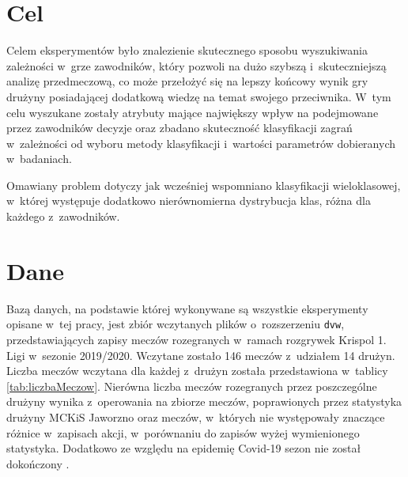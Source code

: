 \documentclass[a4paper,twoside,12pt]{book}
\begin{document}
\section{Cel}
Celem eksperymentów było znalezienie skutecznego sposobu wyszukiwania zależności w~grze zawodników, który pozwoli na dużo szybszą i~skuteczniejszą analizę przedmeczową, co może przełożyć się na lepszy końcowy wynik gry drużyny posiadającej dodatkową wiedzę na temat swojego przeciwnika. W~tym celu wyszukane zostały atrybuty mające największy wpływ na podejmowane przez zawodników decyzje oraz zbadano skuteczność klasyfikacji zagrań w~zależności od wyboru metody klasyfikacji i~wartości parametrów dobieranych w~badaniach. 

Omawiany problem dotyczy jak wcześniej wspomniano klasyfikacji wieloklasowej, w~której występuje dodatkowo nierównomierna dystrybucja klas, różna dla każdego z~zawodników.


\section{Dane}
\label{roz:dane}

Bazą danych, na podstawie której wykonywane są wszystkie eksperymenty opisane w~tej pracy, jest zbiór wczytanych plików o~rozszerzeniu \texttt{dvw}, przedstawiających zapisy meczów rozegranych w~ramach rozgrywek Krispol 1. Ligi w~sezonie 2019/2020. Wczytane zostało 146 meczów z~udziałem 14 drużyn. Liczba meczów wczytana dla każdej z~drużyn została przedstawiona w~tablicy \ref{tab:liczbaMeczow}. Nierówna liczba meczów rozegranych przez poszczególne drużyny wynika z~operowania na zbiorze meczów, poprawionych przez statystyka drużyny MCKiS Jaworzno oraz meczów, w~których nie występowały znaczące różnice w~zapisach akcji, w~porównaniu do zapisów wyżej wymienionego statystyka. Dodatkowo ze względu na epidemię Covid-19 sezon nie został dokończony \cite{bib:seasonEnd}. 
\end{document}
